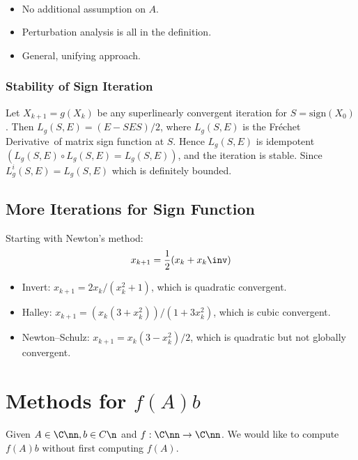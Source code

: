 \documentclass{article}
\def\FD{Fr\'echet Derivative}
\def\sign{\mathrm{sign}}
\begin{document}
\begin{remark}
    \ 
    \begin{itemize}
        \item No additional assumption on $A$.
        \item Perturbation analysis is all in the definition.
        \item General, unifying approach.
    \end{itemize}
\end{remark}

\subsubsection{Stability of Sign Iteration}
\begin{theorem}
    Let $X_{k+1} =g(X_k)$ be any superlinearly convergent iteration for
    $S = \sign(X_0)$. Then $L_g(S,E) = (E-SES)/2$, where $L_g(S,E)$ is
    the \FD\ of matrix sign function at $S$. Hence $L_g(S,E)$ is idempotent
    $(L_g(S,E)\circ L_g(S,E) = L_g(S,E))$, and the iteration is stable.
    Since $L^i_g(S,E) = L_g(S,E)$ which is definitely bounded.
\end{theorem}

\subsection{More Iterations for Sign Function}
Starting with Newton's method:
\begin{equation}\notag
    x_{k+1} = \frac 12 (x_k + x_k\inv)
\end{equation}
\begin{itemize}
    \item Invert: $x_{k+1} = 2x_k/(x^2_k +1)$, which is quadratic
    convergent. 
    \item Halley: $x_{k+1} = (x_k(3+x_k^2))/(1+3x_k^2)$, which is cubic
    convergent. 
    \item Newton--Schulz: $x_{k+1} = x_k(3-x_k^2)/2$, which is quadratic
    but not globally convergent. 
\end{itemize}

\section{Methods for $f(A)b$}
Given $A\in\C\nn, b \in C\n$ and $f:\C\nn \to \C\nn$. We would like to
compute $f(A)b$ without first computing $f(A)$.
\end{document}
